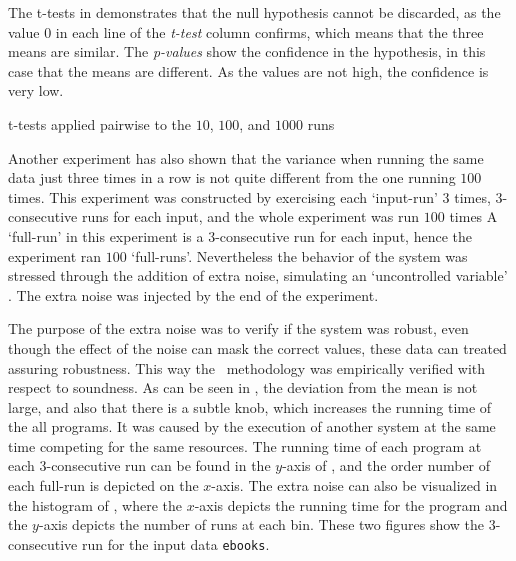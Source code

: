 The t-tests in  demonstrates that the null hypothesis cannot be discarded, as the value $0$ in each line of the \emph{t-test} column confirms, which means that the three means are similar. The \emph{p-values} show the confidence in the hypothesis, in this case that the means are different. As the values are not high, the confidence is very low.

\begin{table}
  \centering
  \begin{tiny}
  
  \end{tiny}
  \caption{t-tests applied pairwise to the $10$, $100$, and $1000$ runs}
  \label{tab:ttest}
\end{table}

Another experiment has also shown that the variance when running the same data just three times in a row is not quite different from the one running $100$ times. This experiment was constructed by exercising each `input-run' $3$ times, $3$-consecutive runs for each input, and the whole experiment was run $100$ times%
A `full-run' in this experiment is a $3$-consecutive run for each input, hence the experiment ran $100$ `full-runs'. Nevertheless the behavior of the system was stressed through the addition of extra noise, simulating an `uncontrolled variable' \cite{Kalibera2013}. The extra noise was injected by the end of the experiment.

The purpose of the extra noise was to verify if the system was robust, even though the effect of the noise can mask the correct values, these data can treated assuring robustness. This way the \CP\ methodology was empirically verified with respect to soundness. As can be seen in , the deviation from the mean is not large, and also that there is a subtle knob, which increases the running time of the all programs. It was caused by the execution of another system at the same time competing for the same resources. The running time of each program at each 3-consecutive run can be found in the $y$-axis of , and the order number of each full-run is depicted on the $x$-axis. The extra noise can also be visualized in the histogram of , where the $x$-axis depicts the running time for the program and the $y$-axis depicts the number of runs at each bin. These two figures show the $3$-consecutive run for the input data {\tt ebooks}.

